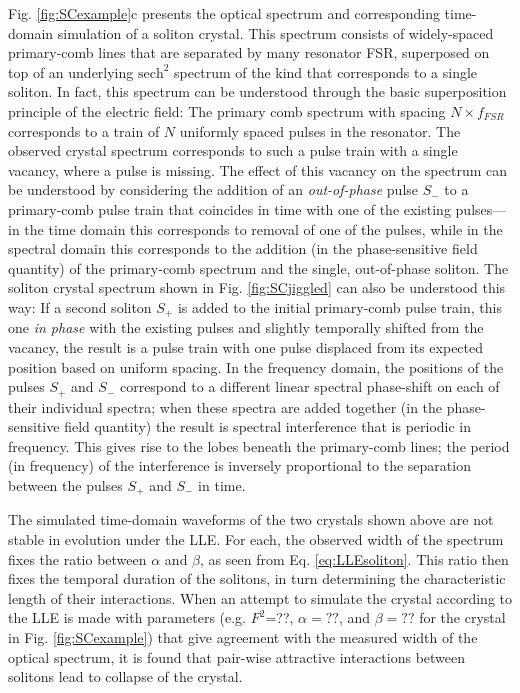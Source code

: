 Fig. \ref{fig:SCexample}c presents the optical spectrum and corresponding time-domain simulation of a soliton crystal. This spectrum consists of widely-spaced primary-comb lines that are separated by many resonator FSR, superposed on top of an underlying $\mathrm{sech}^2$ spectrum of the kind that corresponds to a single soliton. In fact, this spectrum can be understood through the basic superposition principle of the electric field: The primary comb spectrum with spacing $N\times f_{FSR}$ corresponds to a train of $N$ uniformly spaced pulses in the resonator. The observed crystal spectrum corresponds to such a pulse train with a single vacancy, where a pulse is missing. The effect of this vacancy on the spectrum can be understood by considering the addition of an \textit{out-of-phase} pulse $S_-$ to a primary-comb pulse train that coincides in time with one of the existing pulses---in the time domain this corresponds to removal of one of the pulses, while in the spectral domain this corresponds to the addition (in the phase-sensitive field quantity) of the primary-comb spectrum and the single, out-of-phase soliton. The soliton crystal spectrum shown in Fig. \ref{fig:SCjiggled} can also be understood this way: If a second soliton $S_+$ is added to the initial primary-comb pulse train, this one \textit{in phase} with the existing pulses and slightly temporally shifted from the vacancy, the result is a pulse train with one pulse displaced from its expected position based on uniform spacing. In the frequency domain, the positions of the pulses $S_+$ and $S_-$ correspond to a different linear spectral phase-shift on each of their individual spectra; when these spectra are added together (in the phase-sensitive field quantity) the result is spectral interference that is periodic in frequency. This gives rise to the lobes beneath the primary-comb lines; the period (in frequency) of the interference is inversely proportional to the separation between the pulses $S_+$ and $S_-$ in time.

The simulated time-domain waveforms of the two crystals shown above are not stable in evolution under the LLE. For each, the observed width of the spectrum fixes the ratio between $\alpha$ and $\beta$, as seen from Eq. \ref{eq:LLEsoliton}. This ratio then fixes the temporal duration of the solitons, in turn determining the characteristic length of their interactions. When an attempt to simulate the crystal according to the LLE is made with parameters (e.g. $F^2$=??, $\alpha=??$, and $\beta=??$ for the crystal in Fig. \ref{fig:SCexample}) that give agreement with the measured width of the optical spectrum, it is found that pair-wise attractive interactions between solitons lead to collapse of the crystal.

